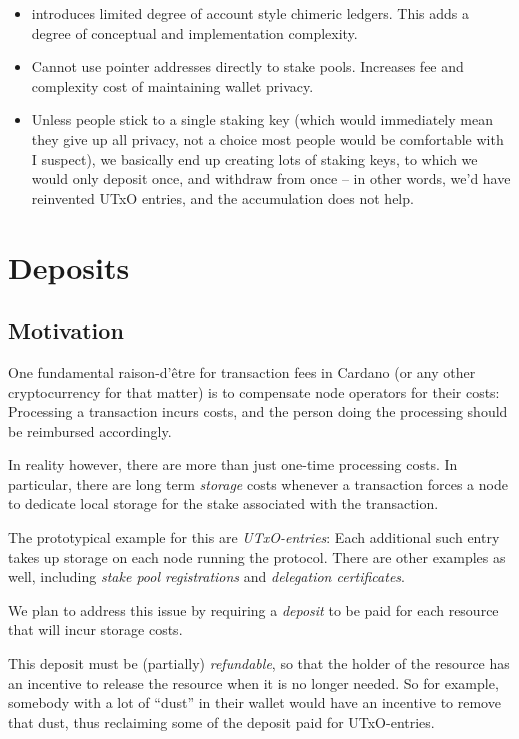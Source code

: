 \documentclass[11pt,a4paper,dvipsnames,twosided]{article}
\begin{document}
\begin{itemize}
\item
  introduces limited degree of account style chimeric ledgers. This adds
  a degree of conceptual and implementation complexity.
\item
  Cannot use pointer addresses directly to stake pools. Increases fee
  and complexity cost of maintaining wallet privacy.
\item
  Unless people stick to a single staking key (which would immediately
  mean they give up all privacy, not a choice most people would be
  comfortable with I suspect), we basically end up creating lots of
  staking keys, to which we would only deposit once, and withdraw from
  once -- in other words, we'd have reinvented UTxO entries, and the
  accumulation does not help.
\end{itemize}

\section{Deposits}
\label{deposits}

\subsection{Motivation}

One fundamental raison-d'\^{e}tre for transaction fees in Cardano (or any other
cryptocurrency for that matter) is to compensate node operators for their costs:
Processing a transaction incurs costs, and the person doing the processing
should be reimbursed accordingly.

In reality however, there are more than just one-time processing costs.
In particular, there are long term \emph{storage} costs whenever a transaction
forces a node to dedicate local storage for the stake associated with the
transaction.

The prototypical example for this are \emph{UTxO-entries}: Each additional such entry
takes up storage on each node running the protocol.
There are other examples as well, including \emph{stake pool registrations} and
\emph{delegation certificates}.

We plan to address this issue by requiring a \emph{deposit} to be paid for each
resource that will incur storage costs.

This deposit must be (partially) \emph{refundable},
so that the holder of the resource has an incentive to release the resource when
it is no longer needed. So for example, somebody with a lot of ``dust'' in their
wallet would have an incentive to remove that dust, thus reclaiming some of the
deposit paid for UTxO-entries.
\end{document}
